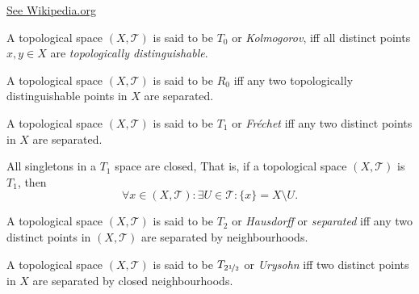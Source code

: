 \href{https://en.wikipedia.org/wiki/Separated_sets}{See Wikipedia.org}


\begin{definition}
	[$T_0$ spaces]
	\label{def: T_1 spaces}
	A topological space $(X, \mathcal T)$ is said to be $T_0$ or \textit{Kolmogorov}, iff all distinct points $x,y \in X$ are \textit{topologically distinguishable}.
\end{definition}


\begin{definition}
	[$R_0$ spaces]
	\label{def: R_0 spaces}
	A topological space $(X, \mathcal T)$ is said to be $R_0$ iff any two topologically distinguishable points in $X$ are separated.
\end{definition}


\begin{definition}
	[$T_1$ spaces]
	\label{def: T_1 spaces}
	A topological space $(X, \mathcal T)$ is said to be $T_1$ or \textit{Fr\'echet} iff any two distinct points in $X$ are separated.
\end{definition}


\begin{proposition}
	\label{prop: all singletons in a T_1 space are closed}
	
	All singletons in a $T_1$ space are closed, That is, if a topological space $(X, \mathcal T)$ is $T_1$, then
	$$
	\forall x \in (X, \mathcal T) : \exists U \in \mathcal T : \{x\} = X \setminus U.
	$$
\end{proposition}


\begin{definition}
	[$T_2$ spaces]
	\label{def: T_2 spaces}
	A topological space $(X, \mathcal T)$ is said to be $T_2$ or \textit{Hausdorff} or \textit{separated} iff any two distinct points in $(X, \mathcal T)$ are separated by neighbourhoods.
\end{definition}


\begin{definition}
	\label{def: T_2.5 spaces}
	A topological space $(X, \mathcal T)$ is said to be $T_{2 \nicefrac{1}{2}}$ or \textit{Urysohn} iff two distinct points in $X$ are separated by closed neighbourhoods.
\end{definition}


